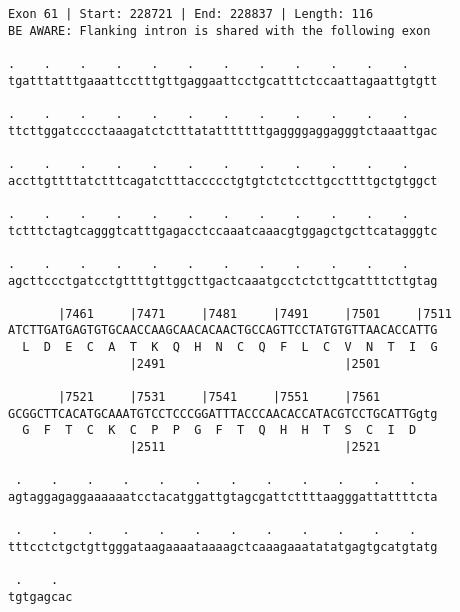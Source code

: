 \documentclass{article}
\begin{document}
\begin{Verbatim}
Exon 61 | Start: 228721 | End: 228837 | Length: 116
BE AWARE: Flanking intron is shared with the following exon
 
.    .    .    .    .    .    .    .    .    .    .    .    
tgatttatttgaaattcctttgttgaggaattcctgcatttctccaattagaattgtgtt
  
.    .    .    .    .    .    .    .    .    .    .    .    
ttcttggatcccctaaagatctctttatatttttttgaggggaggagggtctaaattgac
  
.    .    .    .    .    .    .    .    .    .    .    .    
accttgttttatctttcagatctttaccccctgtgtctctccttgccttttgctgtggct
  
.    .    .    .    .    .    .    .    .    .    .    .    
tctttctagtcagggtcatttgagacctccaaatcaaacgtggagctgcttcatagggtc
  
.    .    .    .    .    .    .    .    .    .    .    .    
agcttccctgatcctgttttgttggcttgactcaaatgcctctcttgcattttcttgtag
  
       |7461     |7471     |7481     |7491     |7501     |7511
ATCTTGATGAGTGTGCAACCAAGCAACACAACTGCCAGTTCCTATGTGTTAACACCATTG
  L  D  E  C  A  T  K  Q  H  N  C  Q  F  L  C  V  N  T  I  G
                 |2491                         |2501        
  
       |7521     |7531     |7541     |7551     |7561        
GCGGCTTCACATGCAAATGTCCTCCCGGATTTACCCAACACCATACGTCCTGCATTGgtg
  G  F  T  C  K  C  P  P  G  F  T  Q  H  H  T  S  C  I  D   
                 |2511                         |2521        
  
 .    .    .    .    .    .    .    .    .    .    .    .   
agtaggagaggaaaaaatcctacatggattgtagcgattcttttaagggattattttcta
  
 .    .    .    .    .    .    .    .    .    .    .    .   
tttcctctgctgttgggataagaaaataaaagctcaaagaaatatatgagtgcatgtatg
  
 .    .  
tgtgagcac
\end{Verbatim}
\newpage
\end{document}

